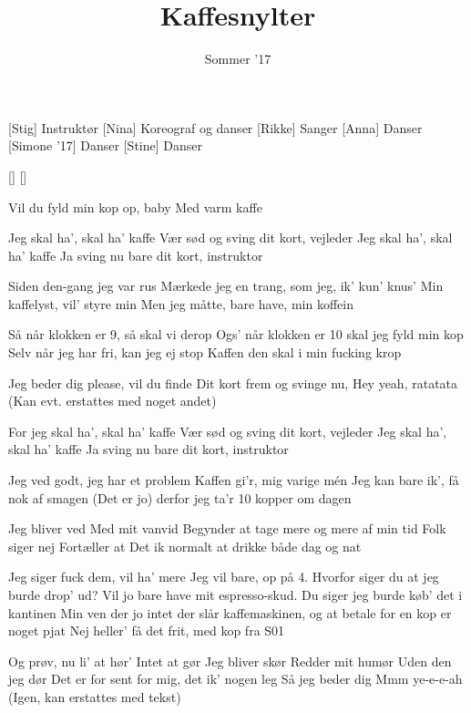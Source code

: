 \documentclass[a4paper,11pt]{article}
\title{Kaffesnylter}
\author{Sommer '17}
\begin{document}
\maketitle

\begin{roles}
[Stig] Instruktør
[Nina] Koreograf og danser
[Rikke] Sanger
[Anna] Danser
[Simone '17] Danser
[Stine] Danser
\end{roles}

\begin{props}
[]
[]
\end{props}


\begin{song}
%
Vil du fyld min kop op, baby
Med varm kaffe

%
Jeg skal ha', skal ha' kaffe
Vær sød og sving dit kort, vejleder
Jeg skal ha', skal ha' kaffe
Ja sving nu bare dit kort, instruktor

%
Siden den-gang jeg var rus
Mærkede jeg en trang, som jeg, ik' kun' knus'
Min kaffelyst, vil' styre min
Men jeg måtte, bare have, min koffein

%
Så når klokken er 9, så skal vi derop
Ogs' når klokken er 10 skal jeg fyld min kop
Selv når jeg har fri, kan jeg ej stop
Kaffen den skal i min fucking krop

%
Jeg beder dig please, vil du finde
Dit kort frem og svinge nu,
Hey yeah, ratatata (Kan evt. erstattes med noget andet)

%
For jeg skal ha', skal ha' kaffe
Vær sød og sving dit kort, vejleder
Jeg skal ha', skal ha' kaffe
Ja sving nu bare dit kort, instruktor

%
Jeg ved godt, jeg har et problem
Kaffen gi'r, mig varige mén
Jeg kan bare ik', få nok af smagen
(Det er jo) derfor jeg ta'r 10 kopper om dagen

%
Jeg bliver ved
Med mit vanvid
Begynder at tage mere og mere af min tid
Folk siger nej
Fortæller at
Det ik normalt at drikke både dag og nat

%
Jeg siger fuck dem, vil ha' mere
Jeg vil bare, op på 4.
Hvorfor siger du at jeg burde drop' ud?
Vil jo bare have mit espresso-skud.
Du siger jeg burde køb' det i kantinen
Min ven der jo intet der slår kaffemaskinen, og at
betale for en kop er noget pjat
Nej heller' få det frit, med kop fra S01

%
Og prøv, nu li' at hør'
Intet at gør
Jeg bliver skør
Redder mit humør
Uden den jeg dør
Det er for sent for mig, det ik' nogen leg
Så jeg beder dig
Mmm ye-e-e-ah (Igen, kan erstattes med tekst)


\end{song}
\end{document}
